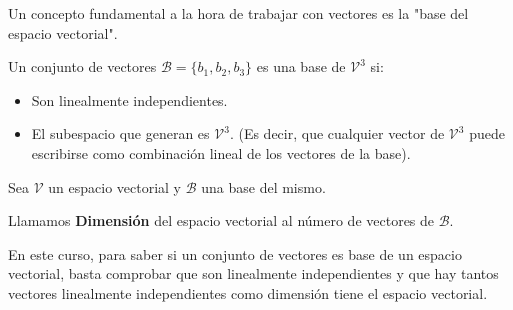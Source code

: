 Un concepto fundamental a la hora de trabajar con vectores es la "base del espacio vectorial". 

\begin{defn}
Un conjunto de vectores $\mathcal{B} = \{b_1,b_2,b_3\}$ es una base de $\mathcal{V}^3$ si:
  \begin{itemize}
      \item Son linealmente independientes.
      \item El subespacio que generan es $\mathcal{V}^3$. (Es decir, que cualquier vector de $\mathcal{V}^3$ puede escribirse como combinación lineal de los vectores de la base).
  \end{itemize}
\end{defn}


\begin{defn}
Sea $\mathcal{V}$ un espacio vectorial y $\mathcal{B}$ una base del mismo.

Llamamos \textbf{Dimensión} del espacio vectorial al número de vectores de $\mathcal{B}$.
\end{defn}

En este curso, para saber si un conjunto de vectores es base de un espacio vectorial, basta comprobar que son linealmente independientes y que hay tantos vectores linealmente independientes como dimensión tiene el espacio vectorial.

